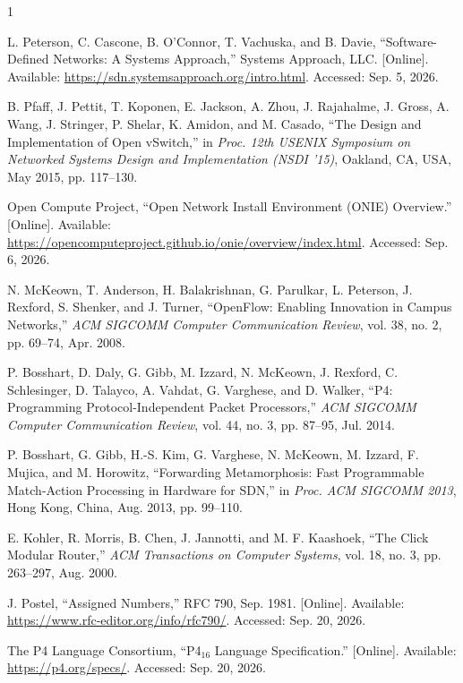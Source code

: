\begin{thebibliography}{1}

L. Peterson, C. Cascone, B. O'Connor, T. Vachuska, and B. Davie, ``Software-Defined Networks: A Systems Approach,'' Systems Approach, LLC. [Online]. Available: \url{https://sdn.systemsapproach.org/intro.html}. Accessed: Sep. 5, 2026.

B. Pfaff, J. Pettit, T. Koponen, E. Jackson, A. Zhou, J. Rajahalme, J. Gross, A. Wang, J. Stringer, P. Shelar, K. Amidon, and M. Casado, ``The Design and Implementation of Open vSwitch,'' in \emph{Proc. 12th USENIX Symposium on Networked Systems Design and Implementation (NSDI '15)}, Oakland, CA, USA, May 2015, pp. 117--130.

Open Compute Project, ``Open Network Install Environment (ONIE) Overview.'' [Online]. Available: \url{https://opencomputeproject.github.io/onie/overview/index.html}. Accessed: Sep. 6, 2026.

N. McKeown, T. Anderson, H. Balakrishnan, G. Parulkar, L. Peterson, J. Rexford, S. Shenker, and J. Turner, ``OpenFlow: Enabling Innovation in Campus Networks,'' \emph{ACM SIGCOMM Computer Communication Review}, vol. 38, no. 2, pp. 69--74, Apr. 2008.

P. Bosshart, D. Daly, G. Gibb, M. Izzard, N. McKeown, J. Rexford, C. Schlesinger, D. Talayco, A. Vahdat, G. Varghese, and D. Walker, ``P4: Programming Protocol-Independent Packet Processors,'' \emph{ACM SIGCOMM Computer Communication Review}, vol. 44, no. 3, pp. 87--95, Jul. 2014.

P. Bosshart, G. Gibb, H.-S. Kim, G. Varghese, N. McKeown, M. Izzard, F. Mujica, and M. Horowitz, ``Forwarding Metamorphosis: Fast Programmable Match-Action Processing in Hardware for SDN,'' in \emph{Proc. ACM SIGCOMM 2013}, Hong Kong, China, Aug. 2013, pp. 99--110.

E. Kohler, R. Morris, B. Chen, J. Jannotti, and M. F. Kaashoek, ``The Click Modular Router,'' \emph{ACM Transactions on Computer Systems}, vol. 18, no. 3, pp. 263--297, Aug. 2000.

J. Postel, ``Assigned Numbers,'' RFC 790, Sep. 1981. [Online]. Available: \url{https://www.rfc-editor.org/info/rfc790/}. Accessed: Sep. 20, 2026.

The P4 Language Consortium, ``P4$_{16}$ Language Specification.'' [Online]. Available: \url{https://p4.org/specs/}. Accessed: Sep. 20, 2026.


\end{thebibliography}
